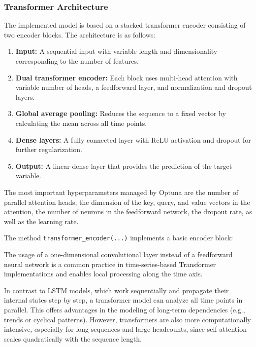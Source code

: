 \subsubsection{Transformer Architecture}

The implemented model is based on a stacked transformer encoder consisting of two encoder blocks.
The architecture is as follows:

\begin{enumerate}
    \item \textbf{Input:} A sequential input with variable length and dimensionality corresponding to the number of features.

    \item \textbf{Dual transformer encoder:} Each block uses multi-head attention with variable number of heads, a feedforward layer, and normalization and dropout layers.

    \item \textbf{Global average pooling:} Reduces the sequence to a fixed vector by calculating the mean across all time points.

    \item \textbf{Dense layers:} A fully connected layer with ReLU activation and dropout for further regularization.

    \item \textbf{Output:} A linear dense layer that provides the prediction of the target variable.
\end{enumerate}

The most important hyperparameters managed by Optuna are the number of parallel attention heads, the dimension of the key, query, and value vectors in the attention, the number of neurons in the feedforward network, the dropout rate, as well as the learning rate.

The method \verb|transformer_encoder(...)| implements a basic encoder block:



The usage of a one-dimensional convolutional layer instead of a feedforward neural network is a common practice in time-series-based Transformer implementations and enables local processing along the time axis.

In contrast to LSTM models, which work sequentially and propagate their internal states step by step, a transformer model can analyze all time points in parallel.
This offers advantages in the modeling of long-term dependencies (e.g., trends or cyclical patterns).
However, transformers are also more computationally intensive, especially for long sequences and large headcounts, since self-attention scales quadratically with the sequence length.

